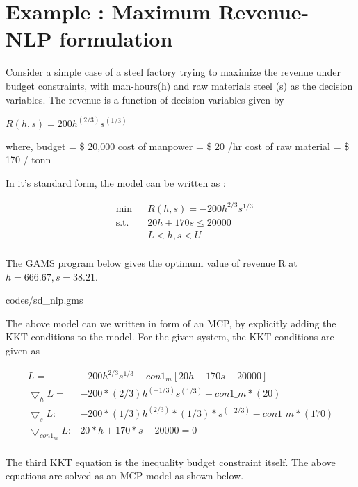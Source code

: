 \documentclass{article}
\begin{document}
\section{Example : Maximum Revenue- NLP formulation}

Consider a simple case of a steel factory trying to maximize the revenue under budget constraints, with man-hours(h) and raw materials steel (s) as the decision variables. The revenue is a function of decision variables given by 

\centerline{$R(h,s) = 200 h^{(2/3)}s^{(1/3)} $ }
\bigbreak
\noindent where, budget = \$ 20,000
cost of manpower = \$ 20 /hr
cost of raw material = \$ 170 / tonn 

\noindent In it's standard form, the model can be written as :

\begin{equation}
\begin{aligned}
&	\min
& & R(h,s) = - 200 h^{2/3}s^{1/3}  \\
& \text{s.t.} & & 	 20h + 170s \leq 20000 \\
& & &			L< h,s < U   \\
\end{aligned}
\end{equation}

The GAMS program below gives the optimum value of revenue R at $h = 666.67 , s = 38.21$.

 {codes/sd_nlp.gms}

\noindent The above model can we written in form of an MCP, by explicitly adding the KKT conditions to the model. For the given system, the KKT conditions are given as

\begin{equation}
\begin{aligned}
 L = & - 200 h^{2/3}s^{1/3} - con1_m [ 20h + 170 s - 20000]	\\
 \bigtriangledown _h L = & - 200* (2/3) h^{(-1/3)}  s^{(1/3)} - con1\_m*(20)  	\\ 
 \bigtriangledown _s L:  & - 200 * (1 / 3) h^{(2/3)} *(1/3) *  s^{(-2/3)} - con1\_m*(170)   \\
 \bigtriangledown _{con1_m} L : &   20*h + 170 * s - 20000 =0 \\
\end{aligned}
\end{equation}

\noindent The third KKT equation is the inequality budget constraint itself. The above equations are solved as an MCP model as shown below.


\end{document}
